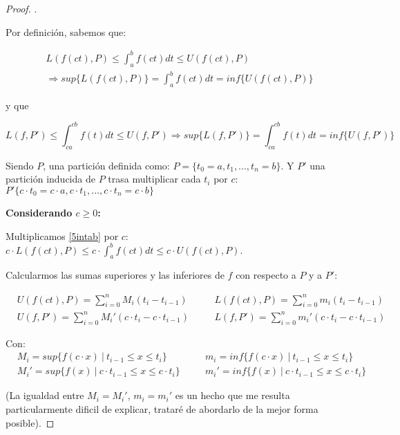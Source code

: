 \documentclass[12pt]{article}
\begin{document}
\begin{proof}
    . \medskip

    Por definici\'on, sabemos que:

    \begin{multline}
        \label{5intab}
        L(f(ct),P)\leq\int_{a}^{b}f(ct)dt\leq U(f(ct),P) \\ \Longrightarrow sup\{L(f(ct),P)\}=\int_{a}^{b}f(ct)dt=inf\{U(f(ct),P)\}
    \end{multline}

    y que

    \begin{equation}
        \label{5intcacb}
        L(f,P')\leq\int_{ca}^{cb}f(t)dt\leq U(f,P') \Longrightarrow sup\{L(f,P')\}=\int_{ca}^{cb}f(t)dt=inf\{U(f,P')\}
    \end{equation}

    Siendo $P$, una partici\'on definida como: \(P=\{t_0=a,t_1,...,t_n=b\}\). Y $P'$ una partici\'on inducida de $P$ trasa multiplicar cada $t_i$ por $c$: \(P'\{c\cdot t_0=c\cdot a,c\cdot t_1,...,c\cdot t_n=c\cdot b\}\)\bigskip

    \textbf{Considerando $c\geq0$:}\bigskip

    Multiplicamos \eqref{5intab} por $c$: \quad \(c\cdot L(f(ct),P)\leq c\cdot\int_{a}^{b}f(ct)dt\leq c\cdot U(f(ct),P)\).\bigskip

    Calcularmos las sumas superiores y las inferiores de $f$ con respecto a $P$ y a $P'$:

    \begin{align*}
        &U(f(ct),P)=\sum_{i=0}^n M_i(t_i-t_{i-1}) \quad &&L(f(ct),P)=\sum_{i=0}^n m_i(t_i-t_{i-1})\\
        &U(f,P')=\sum_{i=0}^n M_i'(c\cdot t_i-c\cdot t_{i-1}) \quad &&L(f,P')=\sum_{i=0}^n m_i'(c\cdot t_i-c\cdot t_{i-1})
    \end{align*}

    Con:
    \begin{align*}
        &M_i=sup\{f(c\cdot x) \ | \ t_{i-1}\leq x\leq t_i\} \quad &&m_i=inf\{f(c\cdot x) \ | \ t_{i-1}\leq x\leq t_i\}\\
        &M_i'=sup\{f(x) \ | \ c\cdot t_{i-1}\leq x\leq c\cdot t_i\} \quad &&m_i'=inf\{f(x) \ | \ c\cdot t_{i-1}\leq x\leq c\cdot t_i\}
    \end{align*}

    (La igualdad entre $M_i=M_i'$, $m_i=m_i'$ es un hecho que me resulta particularmente dificil de explicar, tratar\'e de abordarlo de la mejor forma posible).\bigskip


\end{proof}
\end{document}
